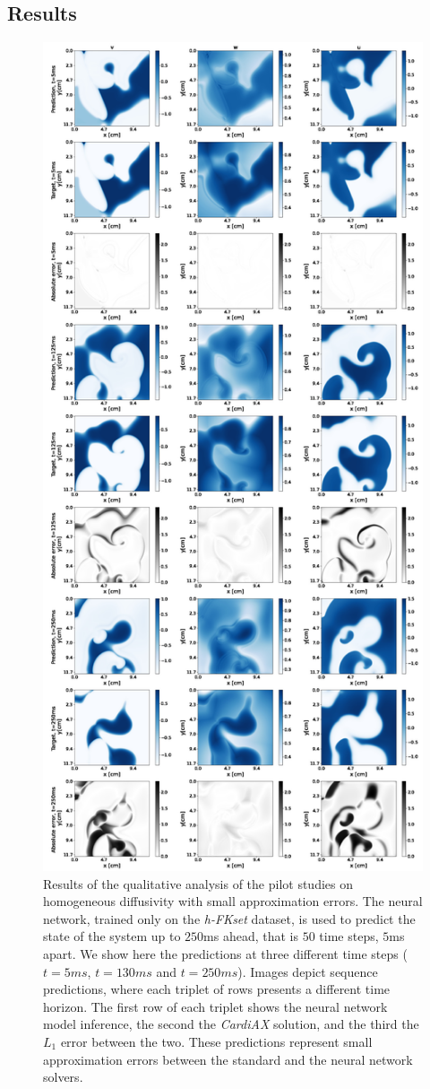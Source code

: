 \documentclass[utf8]{frontiers_suppmat} %
\begin{document}
\subsection{Results}
\begin{figure}[!htp]
\centering
\includegraphics[width=.52\textwidth]{figures/old_figures/Figure-3.jpg}
 \caption{Results of the qualitative analysis of the pilot studies on homogeneous diffusivity with small approximation errors. The neural network, trained only on the \textit{h-FKset} dataset, is used to predict the state of the system up to $250$ms ahead, that is $50$ time steps, $5$ms apart. We show here the predictions at three different time steps ($t=5ms$, $t=130ms$ and $t=250ms$). Images depict sequence predictions, where each triplet of rows presents a different time horizon. The first row of each triplet shows the neural network model inference, the second the \textit{CardiAX} solution, and the third the $L_1$ error between the two.
 These predictions represent small approximation errors between the standard and the neural network solvers.}\label{fig:scarfreequalitativemin}
\end{figure}
\end{document}
